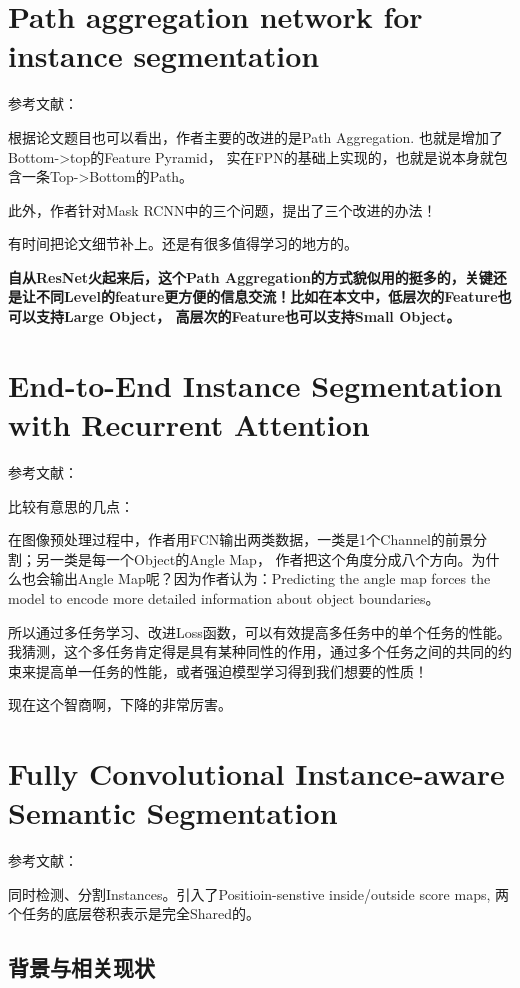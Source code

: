 \section{Path aggregation network for instance segmentation}

参考文献：\cite{liu2018path}

根据论文题目也可以看出，作者主要的改进的是Path Aggregation. 也就是增加了Bottom->top的Feature Pyramid， 实在FPN的基础上实现的，也就是说本身就包含一条Top->Bottom的Path。

此外，作者针对Mask RCNN中的三个问题，提出了三个改进的办法！


有时间把论文细节补上。还是有很多值得学习的地方的。

{\color{red} \bfseries 自从ResNet火起来后，这个Path Aggregation的方式貌似用的挺多的，关键还是让不同Level的feature更方便的信息交流！比如在本文中，低层次的Feature也可以支持Large Object， 高层次的Feature也可以支持Small Object。}


\section{End-to-End Instance Segmentation with Recurrent Attention}

参考文献：\cite{ren2017end}

比较有意思的几点：

在图像预处理过程中，作者用FCN输出两类数据，一类是1个Channel的前景分割；另一类是每一个Object的Angle Map， 作者把这个角度分成八个方向。为什么也会输出Angle Map呢？因为作者认为：Predicting the angle map forces the model to encode more detailed information about object boundaries。

{\color{red} 所以通过多任务学习、改进Loss函数，可以有效提高多任务中的单个任务的性能。我猜测，这个多任务肯定得是具有某种同性的作用，通过多个任务之间的共同的约束来提高单一任务的性能，或者强迫模型学习得到我们想要的性质！}

现在这个智商啊，下降的非常厉害。

\section{Fully Convolutional Instance-aware Semantic Segmentation}

参考文献：\cite{li2016fully}

同时检测、分割Instances。引入了Positioin-senstive inside/outside score maps, 两个任务的底层卷积表示是完全Shared的。

\subsection{背景与相关现状}


